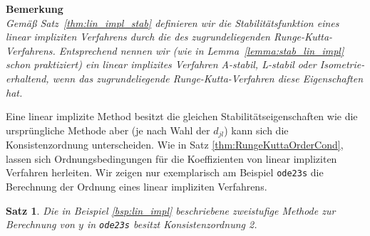 \documentclass[
]{mycourse}
\theoremstyle{mythm}
\newtheorem{theorem}{Satz}[chapter]
\theoremstyle{break}
\begin{document}
\textbf{Bemerkung}\\
{\it Gemäß Satz~\ref{thm:lin_impl_stab} definieren wir die Stabilitätsfunktion eines
linear impliziten Verfahrens durch die des zugrundeliegenden Runge-Kutta-Verfahrens. Entsprechend nennen wir (wie in Lemma~\ref{lemma:stab_lin_impl} schon praktiziert) 
ein linear implizites Verfahren A-stabil, L-stabil oder Isometrie-erhaltend, wenn das 
zugrundeliegende Runge-Kutta-Verfahren diese Eigenschaften hat.}

Eine linear implizite Method besitzt die gleichen Stabilitätseigenschaften wie die ursprüngliche Methode aber (je nach Wahl der $d_{jl}$) kann sich die Konsistenzordnung unterscheiden. Wie in Satz \ref{thm:RungeKuttaOrderCond}, lassen sich Ordnungsbedingungen für die Koeffizienten von linear impliziten Verfahren herleiten. 
Wir zeigen nur exemplarisch am Beispiel \verb.ode23s. die Berechnung der Ordnung eines linear impliziten Verfahrens.

\begin{theorem}
Die in Beispiel \ref{bsp:lin_impl} beschriebene zweistufige Methode zur Berechnung von $y$ in \verb.ode23s. besitzt Konsistenzordnung 2.
\end{theorem}
\end{document}
